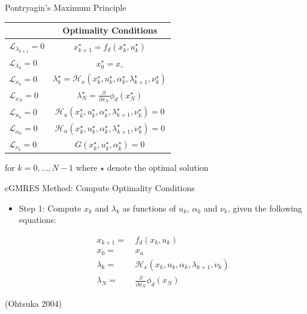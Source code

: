 \documentclass[]{beamer}
\providecommand{\tightlist}{%
  \setlength{\itemsep}{0pt}\setlength{\parskip}{0pt}}
\begin{document}
\begin{frame}{Pontryagin's Maximum Principle}

\begin{longtable}[]{@{}lc@{}}
\toprule
& Optimality Conditions\tabularnewline
\midrule
\endhead
\(\mathcal{L}_{\lambda_{k+1}}=0\) &
\(x_{k+1}^\star=f_d(x_k^\star,u_k^\star)\)\tabularnewline
\(\mathcal{L}_{\lambda_0}=0\) & \(x_0^\star=x_\circ\)\tabularnewline
\(\mathcal{L}_{x_k}=0\) &
\(\lambda_k^\star=\mathcal{H}_x(x_k^\star,u_k^\star,\alpha_k^\star,\lambda_{k+1}^\star,\nu_k^\star)\)\tabularnewline
\(\mathcal{L}_{x_N}=0\) &
\(\lambda_N^\star=\frac{\partial}{\partial x_N}\phi_d(x_N^\star)\)\tabularnewline
\(\mathcal{L}_{u_k}=0\) &
\(\mathcal{H}_u(x_k^\star,u_k^\star,\alpha_k^\star,\lambda_{k+1}^\star,\nu_k^\star)=0\)\tabularnewline
\(\mathcal{L}_{\alpha_k}=0\) &
\(\mathcal{H}_\alpha(x_k^\star,u_k^\star,\alpha_k^\star,\lambda_{k+1}^\star,\nu_k^\star)=0\)\tabularnewline
\(\mathcal{L}_{\nu_k}=0\) &
\(G(x_k^\star,u_k^\star,\alpha_k^\star) = 0\)\tabularnewline
\bottomrule
\end{longtable}

for \(k=0,\ldots,N-1\) where \(\star\) denote the optimal solution

\end{frame}

\begin{frame}{cGMRES Method: Compute Optimality Conditions}

\begin{itemize}
\tightlist
\item
  Step 1: Compute \(x_k\) and \(\lambda_k\) as functions of \(u_k\),
  \(\alpha_k\) and \(\nu_k\), given the following equations:

  \begin{align*}
  x_{k+1}=&\ f_d(x_k,u_k)\\
  x_0=&\ x_n\\
  \lambda_k=&\ \mathcal{H}_x(x_k,u_k,\alpha_k,\lambda_{k+1},\nu_k)\\
  \lambda_N=&\ \frac{\partial}{\partial x_N}\phi_d(x_N)
  \end{align*}
\end{itemize}

(Ohtsuka 2004)

\end{frame}
\end{document}
